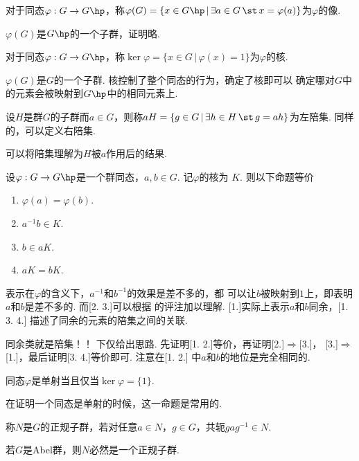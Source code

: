   \begin{defi}[像]
    对于同态$\varphi:G\to G\hp$，称$\varphi(G) = \{x\in G\hp\,|\,
    \exists a\in G \,\st\, x=\varphi(a)\}$为$\varphi$的像.
  \end{defi}
  \remark
    $\varphi(G)$是$G\hp$的一个子群，证明略.

  \begin{defi}[核]
    对于同态$\varphi:G\to G\hp$，称$\ker\varphi = \{x\in G\,|\,
    \varphi(x)=1\}$为$\varphi$的核.
  \end{defi}
  \remark
    $\varphi(G)$是$G$的一个子群. 核控制了整个同态的行为，确定了核即可以
    确定哪对$G$中的元素会被映射到$G\hp$中的相同元素上.

  \begin{defi}[陪集]
    \label{defi: 陪集}
    设$H$是群$G$的子群而$a\in G$，则称$aH=\{g\in G\,|\,
    \exists h\in H\,\st\, g=ah\}$为左陪集. 同样的，可以定义右陪集.
  \end{defi}
  \remark
    可以将陪集理解为$H$被$a$作用后的结果.

  \begin{thm}
    \label{thm: 同余、陪集}
    设$\varphi:G\to G\hp$是一个群同态，$a,b\in G$. 记$\varphi$的核为
    $K$. 则以下命题等价
    \begin{enumerate}
      \item $\varphi(a)=\varphi(b)$.
      \item $a^{-1}b\in K$.
      \item $b\in aK$.
      \item $aK = bK$.
    \end{enumerate}
  \end{thm}
  \remark
    [2.]表示在$\varphi$的含义下，$a^{-1}$和$b^{-1}$的效果是差不多的，都
    可以让$b$被映射到$1$上，即表明$a$和$b$是差不多的. 而[2. 3.]可以根据
    的评注加以理解. [1.]实际上表示$a$和$b$同余，[1. 3. 4.]
    描述了同余的元素的陪集之间的关联.\par
    同余类就是陪集！！
  \proof
    下仅给出思路. 先证明[1. 2.]等价，再证明[2.]$\Rightarrow$[3.]，
    [3.]$\Rightarrow$[1.]，最后证明[3. 4.]等价即可. 注意在[1. 2.]
    中$a$和$b$的地位是完全相同的.

  \begin{cor}[单射]
    同态$\varphi$是单射当且仅当$\ker\varphi = \{1\}$.
  \end{cor}
  \remark
    在证明一个同态是单射的时候，这一命题是常用的.

  \begin{defi}[正规子群]
    称$N$是$G$的正规子群，若对任意$a\in N$，$g\in G$，共轭$gag^{-1}\in N$.
  \end{defi}
  \remark
    若$G$是Abel群，则$N$必然是一个正规子群.

